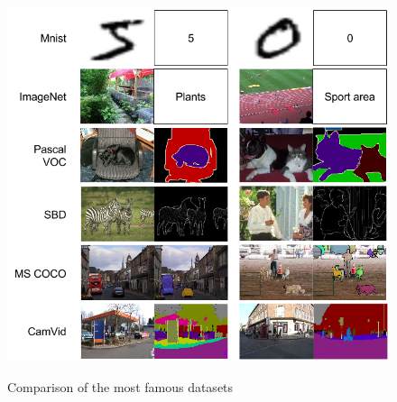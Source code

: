 \begin{appendices}
\begin{figure}[!h]
  \includegraphics[width=1\linewidth,center]{images/appendices/datasets_comparison.png}
  \caption{Comparison of the most famous datasets}\textbf{
  \label{fig:appendices:datasets_comparison}}
\end{figure}


\end{appendices}
